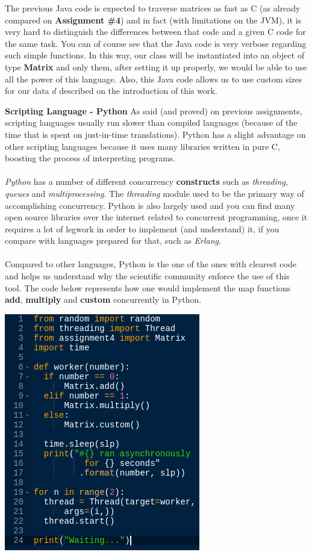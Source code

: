\documentclass[conference]{IEEEtran}
\begin{document}
The previous Java code is expected to traverse matrices as fast as C (as already compared on \textbf{Assignment \#4}) and in fact (with limitations on the JVM), it is very hard to distinguish the differences between that code and a given C code for the same task. You can of course see that the Java code is very verbose regarding such simple functions. In this way, our class will be instantiated into an object of type \textbf{Matrix} and only them, after setting it up properly, we would be able to use all the power of this language. Also, this Java code allows us to use custom sizes for our data $d$ described on the introduction of this work. 

\textbf{ Scripting Language - Python }
As said (and proved) on previous assignments, scripting languages usually run slower than compiled languages (because of the time that is spent on just-in-time translations). Python has a slight advantage on other scripting languages because it uses many libraries written in pure C, boosting the process of interpreting programs.
\\\\
\textit{Python} has a number of different concurrency \textbf{constructs} such as \textit{threading}, \textit{queues} and \textit{multiprocessing}. The \textit{threading} module used to be the primary way of accomplishing concurrency. Python is also largely used and you can find many open source libraries over the internet related to concurrent programming, once it requires a lot of legwork in order to implement (and understand) it, if you compare with languages prepared for that, such as \textit{Erlang}.
\\\\
Compared to other languages, Python is the one of the ones with clearest code and helps us understand why the scientific community enforce the use of this tool. The code below represents how one would implement the map functions \textbf{add}, \textbf{multiply} and \textbf{custom} concurrently in Python.

\includegraphics[scale=0.7]{python_code_5}
\end{document}
